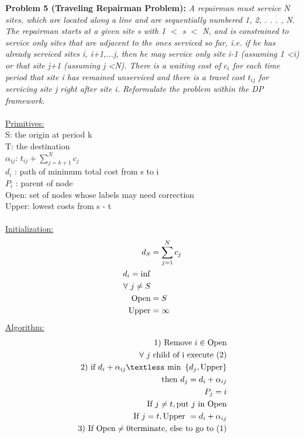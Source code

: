 \documentclass[11pt, english]{article}
\begin{document}
\textbf{Problem 5 (Traveling Repairman Problem):}\textit{ A repairman must service N sites, which are located along a line and are sequentially numbered 1, 2, . . . , N. The repairman starts at a given site s with 1 $<$ s $<$ N, and is constrained to service only sites that are adjacent to the ones serviced so far, i.e. if he has already serviced sites i, i+1,...j, then he may service only site i-1 (assuming 1 \textless i) or that site j+1 (assuming j \textless N). There is a waiting cost of $c_i$ for each time period that site i has remained unserviced and there is a travel cost $t_{ij}$ for servicing site j right after site i. Reformulate the problem within the DP framework.}\\
\\
\underline{Primitives:}\\
S: the origin at period k\\
T: the destination\\ 
$\alpha_{ij}$: $t_{ij} + \sum_{j = k+1}^N c_j$ \\
$d_i$ : path of minimum total cost from s to i \\
$P_i$ : parent of node \\
Open: set of nodes whose labels may need correction \\
Upper: lowest costs from s - t \\
\\ \underline{Initialization:}\\
\begin{align*}
d_S &= \sum_{j = 1}^N c_j \\ 
d_i = \inf \\ 
\forall \ j \neq S \\
\textup{Open} &= {S} \\
\textup{Upper} &= \infty \\
\end{align*}
\underline{Algorithm:}\\
\begin{align*}
1) \ \textup{Remove} \ i \in \textup{Open} \\
\forall \ j \ \textup{child of i execute} \ (2) \\
2) \ \textup{if}\ d_i + \alpha_{ij} \textless \ \textup{min}\ \left\{d_j, \textup{Upper}\right\} \\
\textup{then} \ d_j = d_i + \alpha_{ij} \\ 
P_j = i\\ 
\textup{If} \ j \neq t, \textup{put} \ j \ \textup{in Open}\\
\textup{If} \ j = t, \textup{Upper}\ = d_i + \alpha_{ij}\\
3) \ \textup{If Open} \neq 0 \textup{terminate, else to go to} \ (1)
\end{align*}
\end{document}

